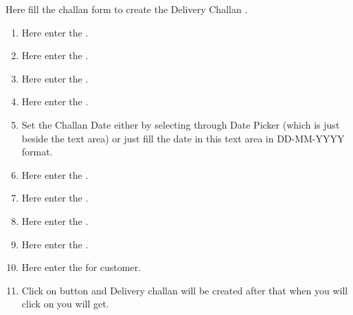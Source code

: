 \documentclass[letterpaper,10pt,english]{sphinxmanual}
\begin{document}
\begin{figure}[htbp]
\centering

\noindent{}
\end{figure}

Here fill the challan form to create the Delivery Challan .
\begin{enumerate}
\item {} 
Here enter the  .

\item {} 
Here enter the  .

\item {} 
Here enter the  .

\item {} 
Here enter the  .

\item {} 
Set the Challan Date either by selecting through Date Picker (which is just beside the text area) or just fill the date in this text area in DD-MM-YYYY format.

\item {} 
Here enter the  .

\item {} 
Here enter the  .

\item {} 
Here enter the  .

\item {} 
Here enter the  .

\item {} 
Here enter the  for customer.

\item {} 
Click on  button and Delivery challan will be created after that when you will click on  you will get.

\end{enumerate}

\begin{figure}[htbp]
\centering

\noindent{}
\end{figure}
\end{document}
